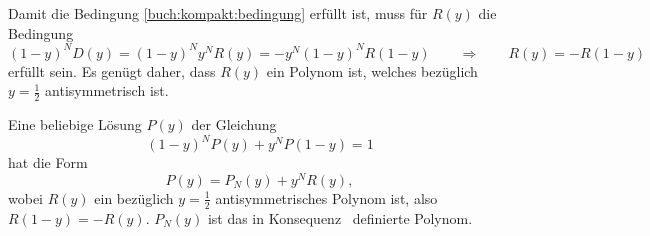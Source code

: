 Damit die Bedingung \eqref{buch:kompakt:bedingung} erfüllt ist, muss
für $R(y)$ die Bedingung
\[
(1-y)^N
D(y)
=
(1-y)^N
y^N
R(y)
=
-y^N
(1-y)^N
R(1-y)
\qquad\Rightarrow\qquad
R(y) = -R(1-y)
\]
erfüllt sein.
Es genügt daher, dass $R(y)$ ein Polynom ist, welches bezüglich $y=\frac12$
antisymmetrisch ist.

\begin{konsequenz}
Eine beliebige Lösung $P(y)$ der Gleichung 
\[
(1-y)^N P(y) + y^N P(1-y)=1
\]
hat die Form
\[
P(y) = P_N(y) + y^N R(y),
\]
wobei $R(y)$ ein bezüglich $y=\frac12$ antisymmetrisches Polynom ist,
also $R(1-y)=-R(y)$.
$P_N(y)$ ist das in Konsequenz~\label{buch:kompakt:lemma-partial}
definierte Polynom.
\end{konsequenz}



